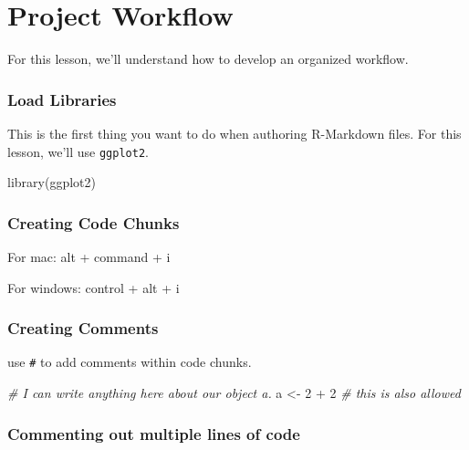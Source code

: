 \documentclass[
]{book}
\newenvironment{Shaded}{\begin{snugshade}}{\end{snugshade}}
\newcommand{\CommentTok}[1]{\textcolor[rgb]{0.56,0.35,0.01}{\textit{#1}}}
\newcommand{\DecValTok}[1]{\textcolor[rgb]{0.00,0.00,0.81}{#1}}
\newcommand{\FunctionTok}[1]{\textcolor[rgb]{0.00,0.00,0.00}{#1}}
\newcommand{\NormalTok}[1]{#1}
\newcommand{\OtherTok}[1]{\textcolor[rgb]{0.56,0.35,0.01}{#1}}
\newcommand{\SpecialCharTok}[1]{\textcolor[rgb]{0.00,0.00,0.00}{#1}}
\begin{document}
\hypertarget{project-workflow}{%
\chapter{Project Workflow}\label{project-workflow}}

For this lesson, we'll understand how to develop an organized workflow.

\hypertarget{load-libraries}{%
\subsection{Load Libraries}\label{load-libraries}}

This is the first thing you want to do when authoring R-Markdown files. For this lesson, we'll use \texttt{ggplot2}.

\begin{Shaded}
\begin{Highlighting}[]
\FunctionTok{library}\NormalTok{(ggplot2)}
\end{Highlighting}
\end{Shaded}

\hypertarget{creating-code-chunks}{%
\subsection{Creating Code Chunks}\label{creating-code-chunks}}

For mac: alt + command + i

For windows: control + alt + i

\hypertarget{creating-comments}{%
\subsection{Creating Comments}\label{creating-comments}}

use \texttt{\#} to add comments within code chunks.

\begin{Shaded}
\begin{Highlighting}[]
\CommentTok{\# I can write anything here about our object a.}
\NormalTok{a }\OtherTok{\textless{}{-}} \DecValTok{2} \SpecialCharTok{+} \DecValTok{2} \CommentTok{\# this is also allowed}
\end{Highlighting}
\end{Shaded}

\hypertarget{commenting-out-multiple-lines-of-code}{%
\subsection{Commenting out multiple lines of code}\label{commenting-out-multiple-lines-of-code}}
\end{document}
